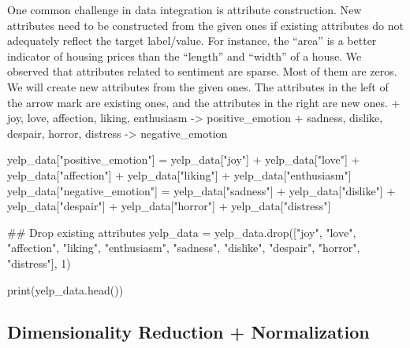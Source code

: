 \documentclass[
  letterpaper,
]{scrbook}
\newenvironment{Shaded}{\begin{snugshade}}{\end{snugshade}}
\newcommand{\BuiltInTok}[1]{\textcolor[rgb]{0.00,0.23,0.31}{#1}}
\newcommand{\CommentTok}[1]{\textcolor[rgb]{0.37,0.37,0.37}{#1}}
\newcommand{\DecValTok}[1]{\textcolor[rgb]{0.68,0.00,0.00}{#1}}
\newcommand{\NormalTok}[1]{\textcolor[rgb]{0.00,0.23,0.31}{#1}}
\newcommand{\OperatorTok}[1]{\textcolor[rgb]{0.37,0.37,0.37}{#1}}
\newcommand{\StringTok}[1]{\textcolor[rgb]{0.13,0.47,0.30}{#1}}
\begin{document}
One common challenge in data integration is attribute construction. New
attributes need to be constructed from the given ones if existing
attributes do not adequately reflect the target label/value. For
instance, the ``area'' is a better indicator of housing prices than the
``length'' and ``width'' of a house. We observed that attributes related
to sentiment are sparse. Most of them are zeros. We will create new
attributes from the given ones. The attributes in the left of the arrow
mark are existing ones, and the attributes in the right are new ones. +
joy, love, affection, liking, enthusiasm -\textgreater{}
positive\_emotion + sadness, dislike, despair, horror, distress
-\textgreater{} negative\_emotion

\begin{Shaded}
\begin{Highlighting}[]
\NormalTok{yelp\_data[}\StringTok{"positive\_emotion"}\NormalTok{] }\OperatorTok{=}\NormalTok{ yelp\_data[}\StringTok{"joy"}\NormalTok{] }\OperatorTok{+}\NormalTok{ yelp\_data[}\StringTok{"love"}\NormalTok{] }\OperatorTok{+}\NormalTok{ yelp\_data[}\StringTok{"affection"}\NormalTok{] }\OperatorTok{+}\NormalTok{ yelp\_data[}\StringTok{"liking"}\NormalTok{] }\OperatorTok{+}\NormalTok{ yelp\_data[}\StringTok{"enthusiasm"}\NormalTok{]}
\NormalTok{yelp\_data[}\StringTok{"negative\_emotion"}\NormalTok{] }\OperatorTok{=}\NormalTok{ yelp\_data[}\StringTok{"sadness"}\NormalTok{] }\OperatorTok{+}\NormalTok{ yelp\_data[}\StringTok{"dislike"}\NormalTok{] }\OperatorTok{+}\NormalTok{ yelp\_data[}\StringTok{"despair"}\NormalTok{] }\OperatorTok{+}\NormalTok{ yelp\_data[}\StringTok{"horror"}\NormalTok{] }\OperatorTok{+}\NormalTok{ yelp\_data[}\StringTok{"distress"}\NormalTok{]}

\CommentTok{\#\# Drop existing attributes}
\NormalTok{yelp\_data }\OperatorTok{=}\NormalTok{ yelp\_data.drop([}\StringTok{"joy"}\NormalTok{, }\StringTok{"love"}\NormalTok{, }\StringTok{"affection"}\NormalTok{, }\StringTok{"liking"}\NormalTok{, }\StringTok{"enthusiasm"}\NormalTok{, }\StringTok{"sadness"}\NormalTok{, }\StringTok{"dislike"}\NormalTok{, }\StringTok{"despair"}\NormalTok{, }\StringTok{"horror"}\NormalTok{, }\StringTok{"distress"}\NormalTok{], }\DecValTok{1}\NormalTok{)    }

\BuiltInTok{print}\NormalTok{(yelp\_data.head())}
\end{Highlighting}
\end{Shaded}

\subsection*{Dimensionality Reduction +
Normalization}\label{dimensionality-reduction-normalization}
\end{document}
